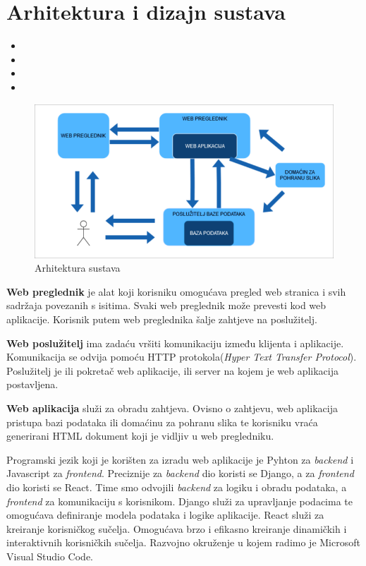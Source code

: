 \chapter{Arhitektura i dizajn sustava}
		
		\begin{itemize}
			\item 	{}
			\item 	{}
			\item 	{}
			\item 	{}
		\end{itemize}

			\begin{figure}[H]
				\includegraphics[scale=0.5]{slike/opis_arhitekture.png} %
				\centering
				\caption{Arhitektura sustava}
			\end{figure}
		\textbf{Web preglednik} je alat koji korisniku omogućava pregled web stranica i  svih sadržaja povezanih s isitima. Svaki web preglednik može prevesti kod web aplikacije. Korisnik putem web preglednika šalje zahtjeve na poslužitelj.

		\textbf{Web poslužitelj} ima zadaću vršiti komunikaciju između klijenta i aplikacije. Komunikacija se odvija pomoću HTTP protokola(\textit{Hyper Text Transfer Protocol}). Poslužitelj je ili pokretač web aplikacije, ili server na kojem je web aplikacija postavljena.

		\textbf{Web aplikacija} služi za obradu zahtjeva. Ovisno o zahtjevu, web aplikacija pristupa bazi podataka ili domaćinu za pohranu slika te korisniku vraća generirani HTML dokument koji je vidljiv u web pregledniku.

		Programski jezik koji je korišten za izradu web aplikacije je Pyhton za \textit{backend} i Javascript za \textit{frontend}. Preciznije za \textit{backend} dio koristi se Django, a za \textit{frontend} dio koristi se React. Time smo odvojili \textit{backend} za logiku i obradu podataka, a \textit{frontend} za komunikaciju s korisnikom. Django služi za upravljanje podacima te omogućava definiranje modela podataka i logike aplikacije. React služi za kreiranje korisničkog sučelja. Omogućava brzo i efikasno kreiranje dinamičkih i interaktivnih korisničkih sučelja. Razvojno okruženje u kojem radimo je Microsoft Visual Studio Code.

